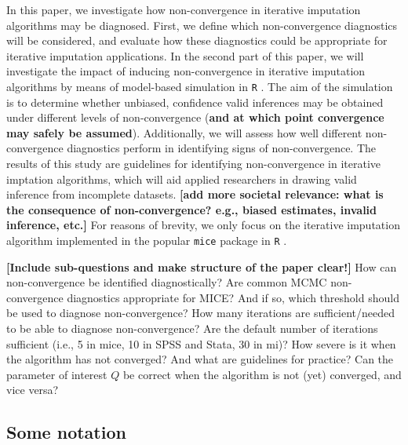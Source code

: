 \documentclass[Royal,times,sageh]{sagej}
\begin{document}
In this paper, we investigate how non-convergence in iterative imputation algorithms may be diagnosed. First, we define which non-convergence diagnostics will be considered, and evaluate how these diagnostics could be appropriate for iterative imputation applications. In the second part of this paper, we will investigate the impact of inducing non-convergence in iterative imputation algorithms by means of model-based simulation in \texttt{R} \citep{R}. The aim of the simulation is to determine whether unbiased, confidence valid inferences may be obtained under different levels of non-convergence (\textbf{and at which point convergence may safely be assumed}). Additionally, we will assess how well different non-convergence diagnostics perform in identifying signs of non-convergence. The results of this study are guidelines for identifying non-convergence in iterative imptation algorithms, which will aid applied researchers in drawing valid inference from incomplete datasets. \textbf{{[}add more societal relevance: what is the consequence of non-convergence? e.g., biased estimates, invalid inference, etc.{]}} For reasons of brevity, we only focus on the iterative imputation algorithm implemented in the popular \texttt{mice} package \citep{mice} in \texttt{R} \citep{R}.

\textbf{{[}Include sub-questions and make structure of the paper clear!{]}} How can non-convergence be identified diagnostically? Are common MCMC non-convergence diagnostics appropriate for MICE? And if so, which threshold should be used to diagnose non-convergence? How many iterations are sufficient/needed to be able to diagnose non-convergence? Are the default number of iterations sufficient (i.e., 5 in mice, 10 in SPSS and Stata, 30 in mi)? How severe is it when the algorithm has not converged? And what are guidelines for practice? Can the parameter of interest \(Q\) be correct when the algorithm is not (yet) converged, and vice versa?

\hypertarget{some-notation}{%
\subsection{Some notation}\label{some-notation}}
\end{document}
